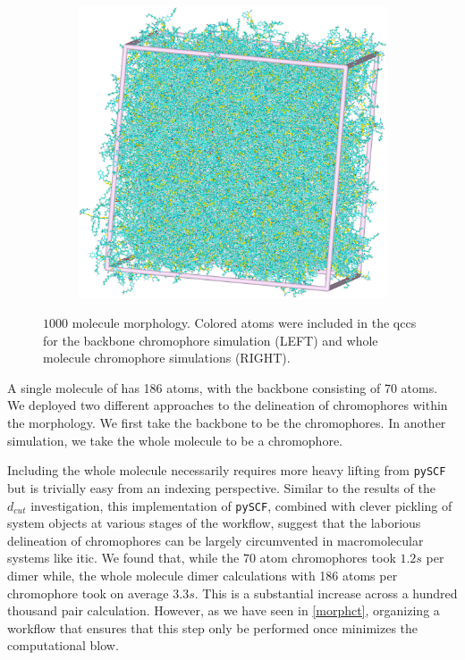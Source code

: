 \begin{figure}
\begin{subfigure}{.5\textwidth}
    \includegraphics[width=\textwidth]{figures/ITIC-unwrapped.png}
\end{subfigure}
    \caption{$1000$ molecule  morphology. Colored atoms were included in the
    \gls{qcc}s for the backbone chromophore simulation (LEFT) and whole molecule chromophore simulations
    (RIGHT).}
\label{ITIC}
\end{figure}

A single molecule of  has 186 atoms, with the backbone consisting of 70 atoms. We deployed two different
approaches to the delineation of chromophores within the  morphology. 
We first take the backbone to be the chromophores. In another simulation, we
take the whole molecule to be a chromophore. 

Including the whole molecule necessarily requires more heavy lifting from \texttt{pySCF} but is trivially easy from an indexing perspective.
Similar to the results of the $d_{cut}$ investigation, 
this implementation of \texttt{pySCF}, combined with clever pickling of system objects at various stages
of the workflow, suggest that the laborious delineation of chromophores can be
largely circumvented in macromolecular systems like \gls{itic}.
We found that, while the 70 atom chromophores took $1.2s$ 
per dimer while, the whole molecule dimer calculations with 186 atoms per
chromophore took on average $3.3s$. This is a substantial increase across a
hundred thousand pair calculation. However, as we have seen in
\autoref{morphct}, organizing a workflow that ensures that this step only be
performed once minimizes the computational blow.


